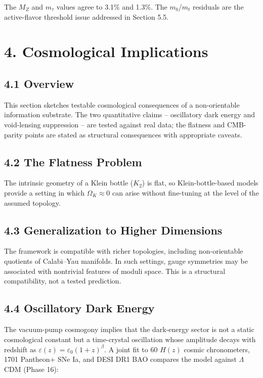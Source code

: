 \documentclass[
  11pt,
]{article}
\begin{document}
The \(M_Z\) and \(m_\tau\) values agree to 3.1\% and 1.3\%. The
\(m_b\)/\(m_t\) residuals are the active-flavor threshold issue
addressed in Section 5.5.

\section{4. Cosmological Implications}\label{cosmological-implications}

\subsection{4.1 Overview}\label{overview-1}

This section sketches testable cosmological consequences of a
non-orientable information substrate. The two quantitative claims --
oscillatory dark energy and void-lensing suppression -- are tested
against real data; the flatness and CMB-parity points are stated as
structural consequences with appropriate caveats.

\subsection{4.2 The Flatness Problem}\label{the-flatness-problem}

The intrinsic geometry of a Klein bottle (\(K_2\)) is flat, so
Klein-bottle-based models provide a setting in which
\(\Omega_K \approx 0\) can arise without fine-tuning at the level of the
assumed topology.

\subsection{4.3 Generalization to Higher
Dimensions}\label{generalization-to-higher-dimensions}

The framework is compatible with richer topologies, including
non-orientable quotients of Calabi--Yau manifolds. In such settings,
gauge symmetries may be associated with nontrivial features of moduli
space. This is a structural compatibility, not a tested prediction.

\subsection{4.4 Oscillatory Dark Energy}\label{oscillatory-dark-energy}

The vacuum-pump cosmogony implies that the dark-energy sector is not a
static cosmological constant but a time-crystal oscillation whose
amplitude decays with redshift as
\(\varepsilon(z) = \varepsilon_0(1+z)^\beta\). A joint fit to 60
\(H(z)\) cosmic chronometers, 1701 Pantheon+ SNe Ia, and DESI DR1 BAO
compares the model against \(\Lambda\)CDM (Phase 16):
\end{document}
